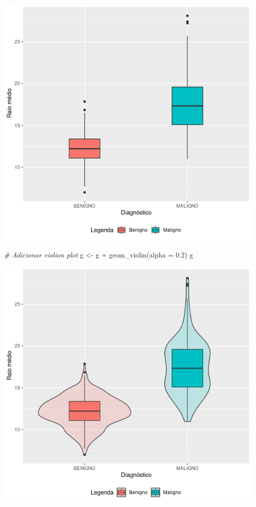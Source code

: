 \documentclass[
]{book}
\newenvironment{Shaded}{\begin{snugshade}}{\end{snugshade}}
\newcommand{\AttributeTok}[1]{\textcolor[rgb]{0.77,0.63,0.00}{#1}}
\newcommand{\CommentTok}[1]{\textcolor[rgb]{0.56,0.35,0.01}{\textit{#1}}}
\newcommand{\FloatTok}[1]{\textcolor[rgb]{0.00,0.00,0.81}{#1}}
\newcommand{\FunctionTok}[1]{\textcolor[rgb]{0.00,0.00,0.00}{#1}}
\newcommand{\NormalTok}[1]{#1}
\newcommand{\OtherTok}[1]{\textcolor[rgb]{0.56,0.35,0.01}{#1}}
\newcommand{\SpecialCharTok}[1]{\textcolor[rgb]{0.00,0.00,0.00}{#1}}
\begin{document}
\includegraphics{figure/g28.png}

\begin{Shaded}
\begin{Highlighting}[]
\CommentTok{\# Adicionar violion plot}
\NormalTok{g }\OtherTok{\textless{}{-}}\NormalTok{ g }\SpecialCharTok{+} \FunctionTok{geom\_violin}\NormalTok{(}\AttributeTok{alpha =} \FloatTok{0.2}\NormalTok{)}
\NormalTok{g}
\end{Highlighting}
\end{Shaded}

\includegraphics{figure/g29.png}
\end{document}
